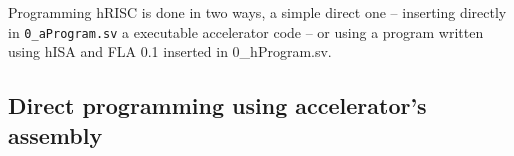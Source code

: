 
Programming hRISC is done in two ways, a simple direct one -- inserting directly in {\tt 0\_aProgram.sv} a executable accelerator code -- or using a program written using hISA and FLA 0.1 inserted in 0\_hProgram.sv.

\subsection{Direct programming using accelerator's assembly}

